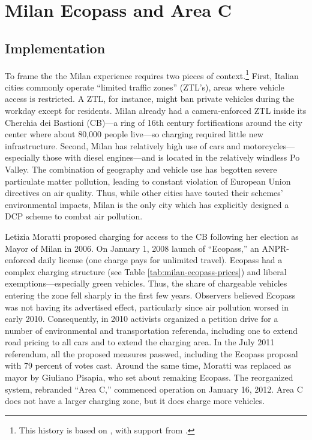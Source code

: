 \section{Milan Ecopass and Area C}\label{sec:milan}

\subsection{Implementation}

To frame the the Milan experience requires two pieces of context.\footnote{This history is based on \citet{Mattioli2012}, with support from \citep{Rotaris2010}.} First, Italian cities commonly operate ``limited traffic zones'' (ZTL's), areas where vehicle access is restricted. A ZTL, for instance, might ban private vehicles during the workday except for residents. Milan already had a camera-enforced ZTL inside its Cherchia dei Bastioni (CB)---a ring of 16th century fortifications around the city center where about 80,000 people live---so charging required little new infrastructure. Second, Milan has relatively high use of cars and motorcycles---especially those with diesel engines---and is located in the relatively windless Po Valley. The combination of geography and vehicle use has begotten severe particulate matter pollution, leading to constant violation of European Union directives on air quality. Thus, while other cities have touted their schemes' environmental impacts, Milan is the only city which has explicitly designed a DCP scheme to combat air pollution.

 Letizia Moratti proposed charging for access to the CB following her election as Mayor of Milan in 2006. On January 1, 2008 launch of ``Ecopass,'' an ANPR-enforced daily license (one charge pays for unlimited travel). Ecopass had a complex charging structure (see Table \ref{tab:milan-ecopass-prices}) and liberal exemptions---especially green vehicles. Thus, the share of chargeable vehicles entering the zone fell sharply in the first few years. Observers believed Ecopass was not having its advertised effect, particularly since air pollution worsed in early 2010. Consequently, in 2010 activists organized a petition drive for a number of environmental and transportation referenda, including one to extend road pricing to all cars and to extend the charging area. In the July 2011 referendum, all the proposed measures passwed, including the Ecopass proposal with 79 percent of votes cast. Around the same time, Moratti was replaced as mayor by Giuliano Pisapia, who set about remaking Ecopass. The reorganized system, rebranded ``Area C,'' commenced operation on January 16, 2012. Area C does not have a larger charging zone, but it does charge more vehicles.

